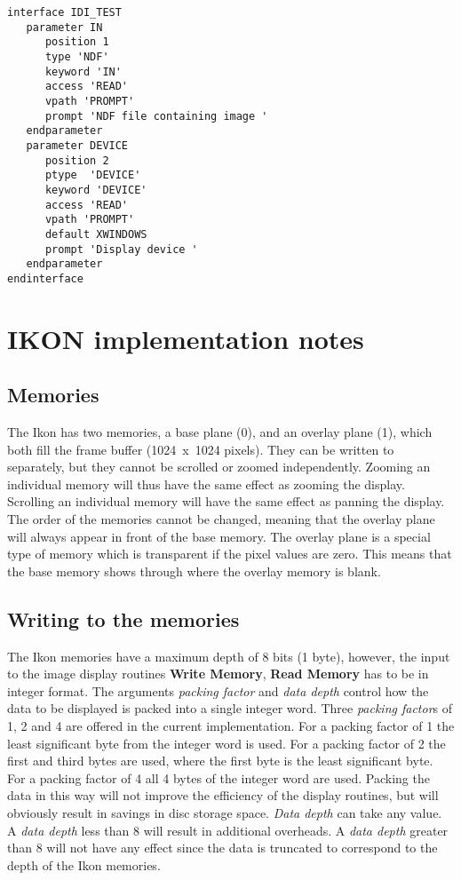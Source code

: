 \newpage
\begin{small}
\begin{verbatim}
interface IDI_TEST
   parameter IN
      position 1
      type 'NDF'
      keyword 'IN'
      access 'READ'
      vpath 'PROMPT'
      prompt 'NDF file containing image '
   endparameter
   parameter DEVICE
      position 2
      ptype  'DEVICE'
      keyword 'DEVICE'
      access 'READ'
      vpath 'PROMPT'
      default XWINDOWS
      prompt 'Display device '
   endparameter
endinterface
\end{verbatim}
\end{small}
      
\newpage
\section{IKON implementation notes}
\label{se:iin}

\subsection{Memories}

The Ikon has two memories, a base plane (0), and an overlay plane (1),
which both fill the frame buffer (1024~x~1024 pixels).
They can be written to separately, but they cannot be scrolled or zoomed
independently. Zooming an individual memory will thus have the same
effect as zooming the display. Scrolling an individual memory will have
the same effect as panning the display. The order of the memories cannot
be changed, meaning that the overlay plane will always appear in front of
the base memory. The overlay plane is a special type of memory which is
transparent if the pixel values are zero. This means that the base memory
shows through where the overlay memory is blank.

\subsection{Writing to the memories}

The Ikon memories have a maximum depth of 8 bits (1 byte), however, the
input to the image display routines {\bf Write Memory}, {\bf Read Memory}
has to be in integer format. The arguments {\it packing factor} and
{\it data depth} control how the data to be displayed is packed into a
single integer word. Three {\it packing factor}s of 1, 2 and 4
are offered in the current implementation. For a packing factor of 1 the
least significant byte from the integer word is used. For a packing factor
of 2 the first and third bytes are used, where the first byte is the
least significant byte. For a packing factor of 4 all 4 bytes of the
integer word are used. Packing the data in this way will not improve
the efficiency of the display routines, but will obviously result in
savings in disc storage space.
{\it Data depth} can take any value. A {\it data depth} less than 8 will
result in additional overheads. A {\it data depth} greater than 8 will
not have any effect since the data is truncated to correspond to the
depth of the Ikon memories.

